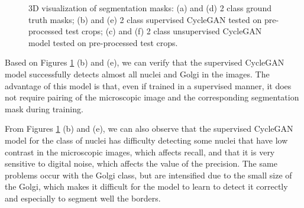 \begin{figure}[!htb]
\hfil
{}\hfil
{} 

\caption{3D visualization of segmentation masks: (a) and (d) 2 class ground truth masks; (b) and (e) 2 class supervised CycleGAN tested on pre-processed test crops; (c) and (f) 2 class unsupervised CycleGAN model tested on pre-processed test crops.}

\label{fig:results-cyclegan-2channel}

\end{figure}

Based on Figures \ref{fig:results-cyclegan-2channel} (b) and (e), we can verify that the supervised CycleGAN model successfully detects almost all nuclei and Golgi in the images. The advantage of this model is that, even if trained in a supervised manner, it does not require pairing of the microscopic image and the corresponding segmentation mask during training. 

From Figures \ref{fig:results-cyclegan-2channel} (b) and (e), we can also observe that the supervised CycleGAN model for the class of nuclei has difficulty detecting some nuclei that have low contrast in the microscopic images, which affects recall, and that it is very sensitive to digital noise, which affects the value of the precision. The same problems occur with the Golgi class, but are intensified due to the small size of the Golgi, which makes it difficult for the model to learn to detect it correctly and especially to segment well the borders.

